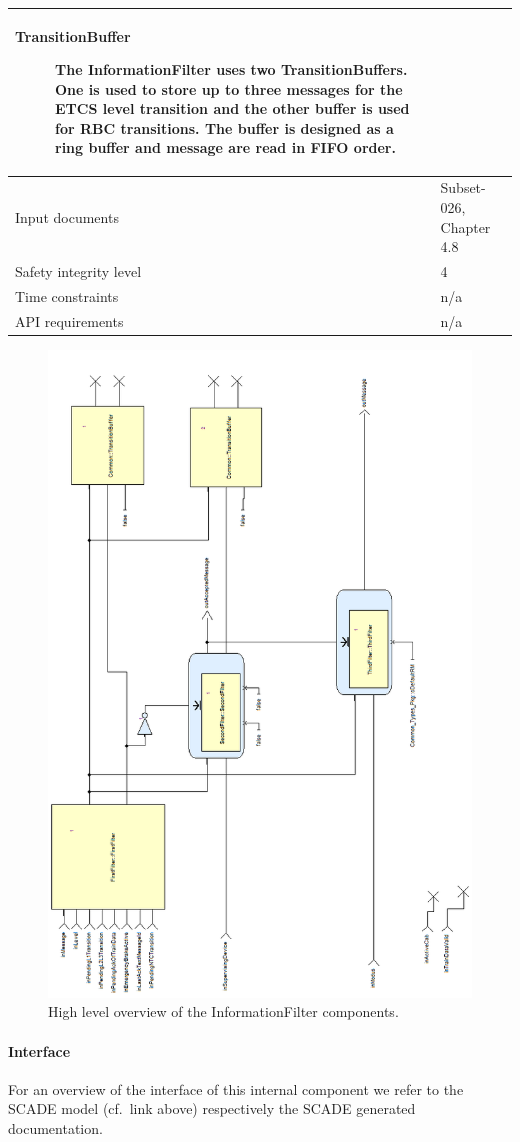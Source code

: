 \begin{longtable}{p{}p{}}
\begin{description}
\item[TransitionBuffer] The InformationFilter uses two
TransitionBuffers. One is used to store up to three messages for the
ETCS level transition and the other buffer is used for RBC
transitions. The buffer is designed as a ring buffer and message are
read in FIFO order.
\end{description} \\
\midrule
Input documents	& 
  Subset-026, Chapter 4.8 \\
\midrule
Safety integrity level	& 4 \\
\midrule
Time constraints		& n/a \\
\midrule
API requirements 		& n/a \\
\bottomrule
\end{longtable}

\begin{figure}
\centering
\includegraphics [width=\textwidth]{images/informationfilter-high-level-rot.png}
\caption{High level overview of the InformationFilter components.}
\label{fig:InformationFilterHighLevel}
\end{figure}

\paragraph{Interface}

For an overview of the interface of this internal component we refer to the SCADE model (cf.~link above) respectively the SCADE generated documentation.